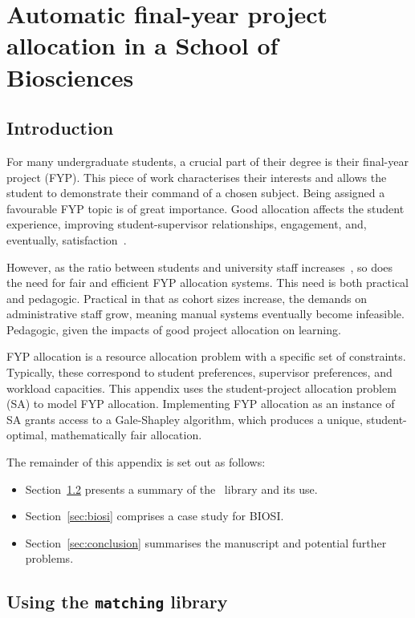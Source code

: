 \chapter{Automatic final-year project allocation in a School of Biosciences}
\label{app:biosci}

\section{Introduction}

For many undergraduate students, a crucial part of their degree is their
final-year project (FYP). This piece of work characterises their interests and
allows the student to demonstrate their command of a chosen subject. Being
assigned a favourable FYP topic is of great importance. Good allocation affects
the student experience, improving student-supervisor relationships, engagement,
and, eventually, satisfaction~\cite{Briffa2018,Kuh2009}.

However, as the ratio between students and university staff
increases~\cite{McDonald2013}, so does the need for fair and efficient FYP
allocation systems. This need is both practical and pedagogic. Practical in that
as cohort sizes increase, the demands on administrative staff grow, meaning
manual systems eventually become infeasible. Pedagogic, given the impacts of
good project allocation on learning.

FYP allocation is a resource allocation problem with a specific set of
constraints. Typically, these correspond to student preferences, supervisor
preferences, and workload capacities. This appendix uses the student-project
allocation problem (SA) to model FYP allocation. Implementing FYP allocation as
an instance of SA grants access to a Gale-Shapley algorithm, which produces a
unique, student-optimal, mathematically fair allocation.

The remainder of this appendix is set out as follows:

\begin{itemize}
    \item Section~\ref{sec:matching} presents a summary of the \matching\
        library and its use.
    \item Section~\ref{sec:biosi} comprises a case study for BIOSI.
    \item Section~\ref{sec:conclusion} summarises the manuscript and potential
        further problems.
\end{itemize}


\section{Using the {\color{grey}\texttt{matching}} library}
\label{sec:matching}



